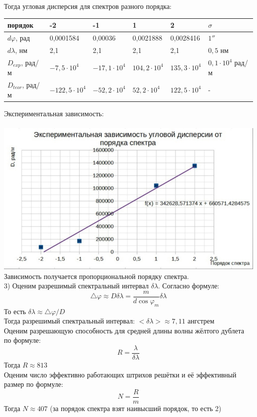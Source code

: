 \documentclass[a4paper]{article}
\begin{document}
Тогда угловая дисперсия для спектров разного порядка:\\
\begin{center}
\begin{tabular}{|l|l|l|l|l|l|}
\hline
       порядок      & -2               & -1               & 1                & 2    & $\sigma$        \\
\hline
$d\varphi$, рад & 0,0001584        & 0,00036          & 0,0021888        & 0,0028416   & $1''$    \\
\hline
$d\lambda$, нм  & 2,1              & 2,1              & 2,1              & 2,1    & $0,5$ нм         \\
\hline
$D_{exp}$, рад/м      & $-7,5\cdot10^4$ & $-17,1\cdot10^4$ & $104,2\cdot 10^4$ & $135,3\cdot10^4$& $0,1\cdot10^4$ рад/м\\
\hline
$D_{teor}$, рад/м &$-122,5\cdot10^4$ &$-52,2\cdot10^4$ &$52,2\cdot10^4$ &$122,5\cdot10^4$ &-  \\
\hline
\end{tabular}
\end{center}
Экспериментальная зависимость:\\
\\
\includegraphics[width=17cm]{g2}\\
Зависимость получается пропорциональной порядку спектра.\\
3) Оценим разрешимый спектральный интервал $\delta \lambda$. Согласно формуле:
$$\triangle \varphi \approx D\delta \lambda = \frac{m}{d\cos \varphi_{m}}\delta \lambda$$
То есть $\delta \lambda \approx \triangle \varphi / D $\\
Тогда разрешимый спектральный интервал: $<\delta \lambda> \approx 7,11$ ангстрем\\
Оценим разрешающую способность для средней длины волны жёлтого дублета по формуле:
$$R = \frac{\lambda}{\delta \lambda}$$
Тогда $R \approx 813$\\
Оценим число эффективно работающих штрихов решётки и её эффективный размер по формуле:
$$N = \frac{R}{m}$$
Тогда $N \approx 407$ (за порядок спектра взят наивысший порядок, то есть 2)\\
\end{document}
